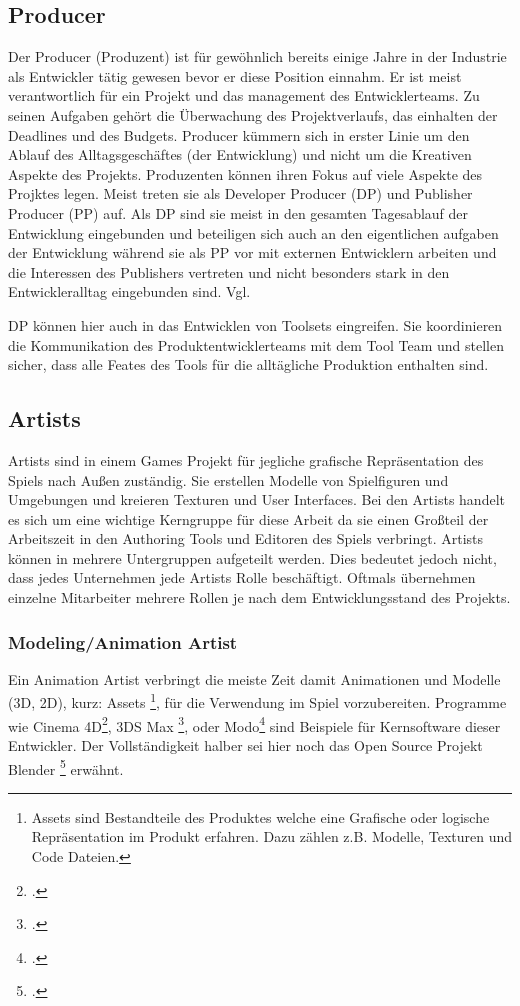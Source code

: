 \documentclass[pagesize, paper=a4, fontsize=12pt, titlepage=true, headings=small, headnosepline, abstractoff, liststotoc, nochapterprefix, plainheadsepline, twoside]{scrreprt}
\begin{document}
\subsection{Producer}
Der Producer (Produzent) ist für gewöhnlich bereits einige Jahre in der Industrie als Entwickler tätig gewesen bevor er diese Position einnahm. Er ist meist verantwortlich für ein Projekt und das management des Entwicklerteams. Zu seinen Aufgaben gehört die Überwachung des Projektverlaufs, das einhalten der Deadlines und des Budgets. Producer kümmern sich in erster Linie um den Ablauf des Alltagsgeschäftes (der Entwicklung) und nicht um die Kreativen Aspekte des Projekts. Produzenten können ihren Fokus auf viele Aspekte des Projktes legen. Meist treten sie als Developer Producer (DP) und Publisher Producer (PP) auf. Als DP sind sie meist in den gesamten Tagesablauf der Entwicklung eingebunden und beteiligen sich auch an den eigentlichen aufgaben der Entwicklung während sie als PP vor mit externen Entwicklern arbeiten und die Interessen des Publishers vertreten und nicht besonders stark in den Entwickleralltag eingebunden sind. Vgl. 

DP können hier auch in das Entwicklen von Toolsets eingreifen. Sie koordinieren die Kommunikation des Produktentwicklerteams mit dem Tool Team und stellen sicher, dass alle Feates des Tools für die alltägliche Produktion enthalten sind.

\subsection{Artists}
Artists sind in einem Games Projekt für jegliche grafische Repräsentation des Spiels nach Außen zuständig. Sie erstellen Modelle von Spielfiguren und Umgebungen und kreieren Texturen und User Interfaces. Bei den Artists handelt es sich um eine wichtige Kerngruppe für diese Arbeit da sie einen Großteil der Arbeitszeit in den Authoring Tools und Editoren des Spiels verbringt. Artists können in mehrere Untergruppen aufgeteilt werden. Dies bedeutet jedoch nicht, dass jedes Unternehmen jede Artists Rolle beschäftigt. Oftmals übernehmen einzelne Mitarbeiter mehrere Rollen je nach dem Entwicklungsstand des Projekts.

\subsubsection{Modeling/Animation Artist}
Ein Animation Artist verbringt die meiste Zeit damit Animationen und Modelle (3D, 2D), kurz: Assets \footnote{Assets sind Bestandteile des Produktes welche eine Grafische oder logische Repräsentation im Produkt erfahren. Dazu zählen z.B. Modelle, Texturen und Code Dateien.}, für die Verwendung im Spiel vorzubereiten. Programme wie Cinema 4D\footcite{MaxonC4d2014}, 3DS Max \footcite{AutodeskMax2014}, oder Modo\footcite{FoundryModo2014} sind Beispiele für Kernsoftware dieser Entwickler. Der Vollständigkeit halber sei hier noch das Open Source Projekt Blender \footcite{Blender2015} erwähnt.
\end{document}
